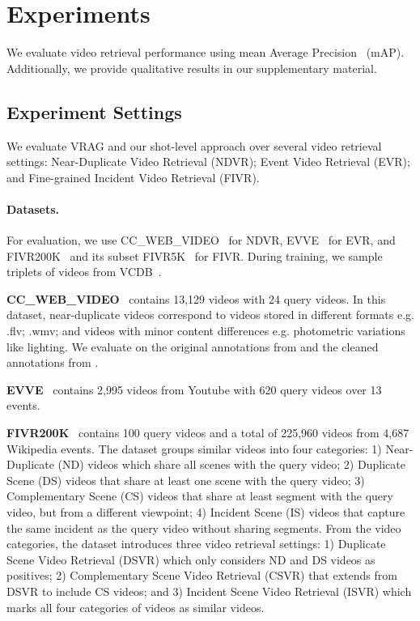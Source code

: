 \documentclass[letterpaper]{article} \usepackage{aaai22}  \usepackage{times}  \usepackage{helvet}  \usepackage{courier}  \usepackage[hyphens]{url}  \usepackage{graphicx} \urlstyle{rm} \usepackage{amsmath}
\begin{document}
\section{Experiments}

We evaluate video retrieval performance using mean Average Precision~\cite{dataset:cc-web-video} (mAP). Additionally, we provide qualitative results in our supplementary material.

\subsection{Experiment Settings}

We evaluate VRAG and our shot-level approach over several video retrieval settings: Near-Duplicate Video Retrieval (NDVR); Event Video Retrieval (EVR); and Fine-grained Incident Video Retrieval (FIVR).

\vspace{0mm}
\paragraph{Datasets.} For evaluation, we use CC\_WEB\_VIDEO~\cite{dataset:cc-web-video} for NDVR, EVVE~\cite{dataset:evve} for EVR, and FIVR200K~\cite{dataset:fivr200k} and its subset FIVR5K~\cite{dataset:fivr200k, kordopatiszilos2019visil} for FIVR. During training, we sample triplets of videos from VCDB~\cite{dataset:vcdb}.

\noindent \textbf{CC\_WEB\_VIDEO}~\cite{dataset:cc-web-video} contains 13,129 videos with 24 query videos. In this dataset, near-duplicate videos correspond to videos stored in different formats e.g. .flv; .wmv; and videos with minor content differences e.g. photometric variations like lighting. We evaluate on the original annotations from \cite{dataset:cc-web-video} and the cleaned annotations from \cite{kordopatiszilos2019visil}. 

\noindent\textbf{EVVE}~\cite{dataset:evve} contains 2,995 videos from Youtube with 620 query videos over 13 events. 

\noindent \textbf{FIVR200K}~\cite{dataset:fivr200k} contains 100 query videos and a total of 225,960 videos from 4,687 Wikipedia events. The dataset groups similar videos into four categories: 1) Near-Duplicate (ND) videos which share all scenes with the query video; 2) Duplicate Scene (DS) videos that share at least one scene with the query video; 3) Complementary Scene (CS) videos that share at least segment with the query video, but from a different viewpoint; 4) Incident Scene (IS) videos that capture the same incident as the query video without sharing segments.
From the video categories, the dataset introduces three video retrieval settings: 1) Duplicate Scene Video Retrieval (DSVR) which only considers ND and DS videos as positives; 2) Complementary Scene Video Retrieval (CSVR) that extends from DSVR to include CS videos; and 3) Incident Scene Video Retrieval (ISVR) which marks all four categories of videos as similar videos.
\end{document}

